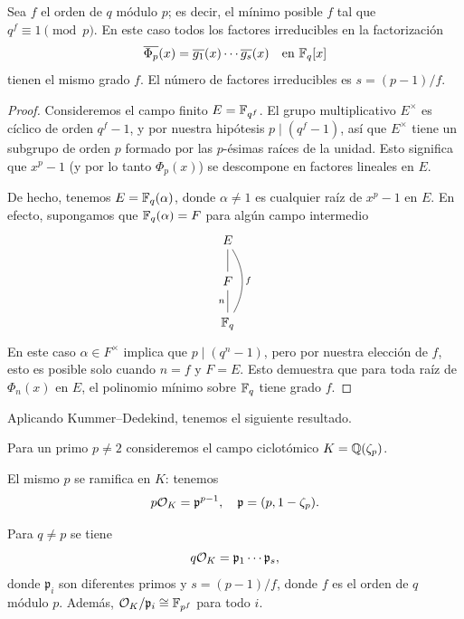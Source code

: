 \begin{lema}
  Sea $f$ el orden de $q$ módulo $p$; es decir, el mínimo posible $f$
  tal que $q^f \equiv 1 \pmod{p}$. En este caso todos los factores irreducibles
  en la factorización
  \[ \overline{\Phi_p} (x) = \overline{g_1} (x) \cdots \overline{g_s} (x)
     \quad\text{en }\mathbb{F}_q [x] \]
  tienen el mismo grado $f$. El número de factores irreducibles es
  $s = (p-1)/f$.

  \begin{proof}
    Consideremos el campo finito $E = \mathbb{F}_{q^f}$. El grupo multiplicativo
    $E^\times$ es cíclico de orden $q^f - 1$, y por nuestra hipótesis
    $p \mid (q^f - 1)$, así que $E^\times$ tiene un subgrupo de orden $p$
    formado por las $p$-ésimas raíces de la unidad. Esto significa que $x^p - 1$
    (y por lo tanto $\Phi_p (x)$) se descompone en factores lineales en $E$.

    De hecho, tenemos $E = \mathbb{F}_q (\alpha)$, donde $\alpha \ne 1$ es cualquier
    raíz de $x^p - 1$ en $E$. En efecto, supongamos que $\mathbb{F}_q (\alpha) = F$
    para algún campo intermedio
    \[ \begin{tikzcd}
      E \ar[-]{d} \ar[-,bend left=30]{dd}{f} \\
      F \ar[-]{d}[swap]{n} \\
      \FF_q
    \end{tikzcd} \]
    En este caso $\alpha \in F^\times$ implica que $p \mid (q^n - 1)$, pero por
    nuestra elección de $f$, esto es posible solo cuando $n = f$ y $F = E$. Esto
    demuestra que para toda raíz de $\Phi_n (x)$ en $E$, el polinomio mínimo
    sobre $\mathbb{F}_q$ tiene grado $f$.
  \end{proof}
\end{lema}

Aplicando Kummer--Dedekind, tenemos el siguiente resultado.

\begin{proposicion}
  Para un primo $p \ne 2$ consideremos el campo ciclotómico $K = \mathbb{Q} (\zeta_p)$.

  El mismo $p$ se ramifica en $K$: tenemos
  $$p \mathcal{O}_K = \mathfrak{p}^{p-1}, \quad \mathfrak{p} = (p, 1 - \zeta_p).$$

  Para $q \ne p$ se tiene
  $$q \mathcal{O}_K = \mathfrak{p}_1\cdots \mathfrak{p}_s,$$
  donde $\mathfrak{p}_i$ son diferentes primos y $s = (p-1)/f$,
  donde $f$ es el orden de $q$ módulo $p$.
  Además, $\mathcal{O}_K/\mathfrak{p}_i \cong \mathbb{F}_{p^f}$ para todo $i$.
\end{proposicion}

